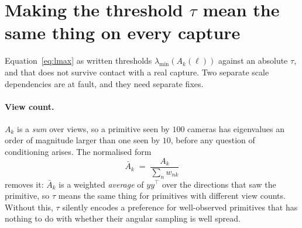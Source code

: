 
\section{Making the threshold $\tau$ mean the same thing on every capture}
\label{sec:b2scale}

Equation~\eqref{eq:lmax} as written thresholds $\lambda_{\min}(A_k(\ell))$
against an absolute $\tau$, and that does not survive contact with a real
capture. Two separate scale dependencies are at fault, and they need separate
fixes.

\paragraph{View count.} $A_k$ is a \emph{sum} over views, so a primitive seen by
$100$ cameras has eigenvalues an order of magnitude larger than one seen by $10$,
before any question of conditioning arises. The normalised form
\begin{equation}
  \bar A_k \;=\; \frac{A_k}{\sum_n w_{nk}}
  \label{eq:gramnorm}
\end{equation}
removes it: $\bar A_k$ is a weighted \emph{average} of $y y^{\!\top}$ over the
directions that saw the primitive, so $\tau$ means the same thing for primitives
with different view counts. Without this, $\tau$ silently encodes a preference
for well-observed primitives that has nothing to do with whether their angular
sampling is well spread.

